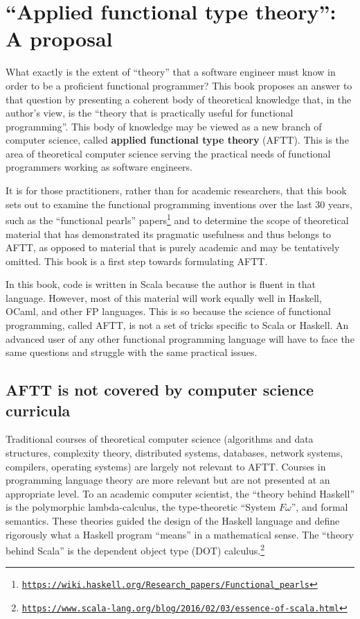 
\chapter{``Applied functional type theory'': A proposal\label{chap:Applied-functional-type}}

What exactly is the extent of ``theory'' that a software engineer
must know in order to be a proficient functional programmer? This
book proposes an answer to that question by presenting a coherent
body of theoretical knowledge that, in the author's view, is the ``theory
that is practically useful for functional programming''. This body
of knowledge may be viewed as a new branch of computer science, called
\textbf{applied functional
type theory} (AFTT). This is the area of theoretical computer science
serving the practical needs of functional programmers working as software
engineers.

It is for those practitioners, rather than for academic researchers,
that this book sets out to examine the functional programming inventions
over the last 30 years, \textemdash{} such as the \textquotedblleft functional
pearls\textquotedblright{} papers\footnote{\texttt{\href{https://wiki.haskell.org/Research_papers/Functional_pearls}{https://wiki.haskell.org/Research\_papers/Functional\_pearls}}}
\textemdash{} and to determine the scope of theoretical material that
has demonstrated its pragmatic usefulness and thus belongs to AFTT,
as opposed to material that is purely academic and may be tentatively
omitted. This book is a first step towards formulating AFTT.

In this book, code is written in Scala because the author is fluent
in that language. However, most of this material will work equally
well in Haskell, OCaml, and other FP languages. This is so because
the science of functional programming, called AFTT, is not a set of
tricks specific to Scala or Haskell. An advanced user of any other
functional programming language will have to face the same questions
and struggle with the same practical issues.

\section{AFTT is not covered by computer science curricula}

Traditional courses of theoretical computer science (algorithms and
data structures, complexity theory, distributed systems, databases,
network systems, compilers, operating systems) are largely not relevant
to AFTT. Courses in programming language theory are more relevant
but are not presented at an appropriate level. To an academic computer
scientist, the ``theory behind Haskell'' is the polymorphic lambda-calculus,
the type-theoretic ``System $F\omega$'', and formal semantics.
These theories guided the design of the Haskell language and define
rigorously what a Haskell program ``means'' in a mathematical sense.
The ``theory behind Scala'' is the dependent object type (DOT) calculus.\footnote{\texttt{\href{https://www.scala-lang.org/blog/2016/02/03/essence-of-scala.html}{https://www.scala-lang.org/blog/2016/02/03/essence-of-scala.html}}}

